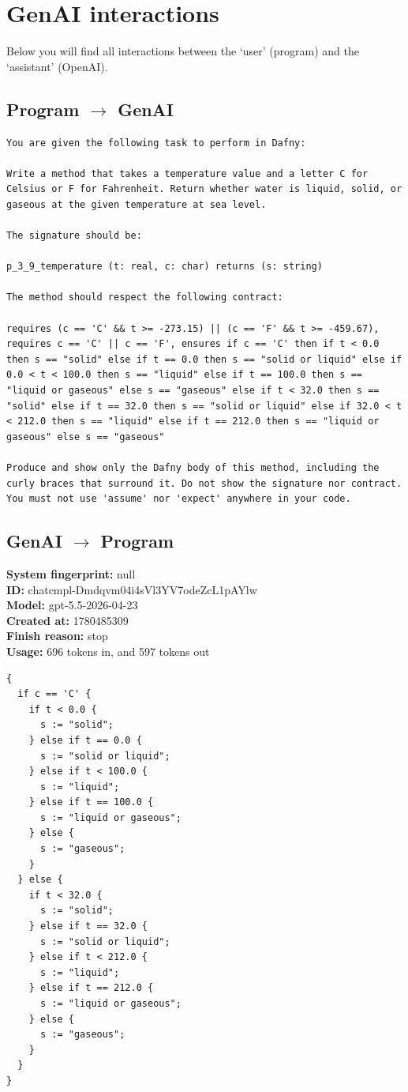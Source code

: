 \documentclass{article}
\begin{document}
\section*{GenAI interactions}
Below you will find all interactions between the `user' (program) and the `assistant' (OpenAI).
\subsection*{Program $\rightarrow$ GenAI}
\begin{lstlisting}
You are given the following task to perform in Dafny:

Write a method that takes a temperature value and a letter C for Celsius or F for Fahrenheit. Return whether water is liquid, solid, or gaseous at the given temperature at sea level.

The signature should be:

p_3_9_temperature (t: real, c: char) returns (s: string)

The method should respect the following contract:

requires (c == 'C' && t >= -273.15) || (c == 'F' && t >= -459.67), requires c == 'C' || c == 'F', ensures if c == 'C' then if t < 0.0 then s == "solid" else if t == 0.0 then s == "solid or liquid" else if 0.0 < t < 100.0 then s == "liquid" else if t == 100.0 then s == "liquid or gaseous" else s == "gaseous" else if t < 32.0 then s == "solid" else if t == 32.0 then s == "solid or liquid" else if 32.0 < t < 212.0 then s == "liquid" else if t == 212.0 then s == "liquid or gaseous" else s == "gaseous"

Produce and show only the Dafny body of this method, including the curly braces that surround it. Do not show the signature nor contract. You must not use 'assume' nor 'expect' anywhere in your code.
\end{lstlisting}
\subsection*{GenAI $\rightarrow$ Program}
\textbf{System fingerprint: }null
\\\textbf{ID: }chatcmpl-Dmdqvm04i4sVl3YV7odeZcL1pAYlw
\\\textbf{Model: }gpt-5.5-2026-04-23
\\\textbf{Created at: }1780485309
\\\textbf{Finish reason: }stop
\\\textbf{Usage: }696 tokens in, and 597 tokens out
\begin{lstlisting}
{
  if c == 'C' {
    if t < 0.0 {
      s := "solid";
    } else if t == 0.0 {
      s := "solid or liquid";
    } else if t < 100.0 {
      s := "liquid";
    } else if t == 100.0 {
      s := "liquid or gaseous";
    } else {
      s := "gaseous";
    }
  } else {
    if t < 32.0 {
      s := "solid";
    } else if t == 32.0 {
      s := "solid or liquid";
    } else if t < 212.0 {
      s := "liquid";
    } else if t == 212.0 {
      s := "liquid or gaseous";
    } else {
      s := "gaseous";
    }
  }
}
\end{lstlisting}
\end{document}
